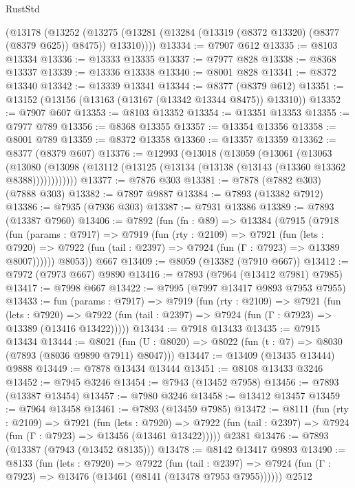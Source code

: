 \begin{lexlean}{RustStd}
\begin{coremodule}
{\begin{coremodule}
{{{{{{{{{{{{{{{{{{{{{{{{{{{{{{{{{{{{{{{{{{{{{{{{{{    (@13178
      (@13252 (@13275 (@13281 (@13284 (@13319 (@8372 @13320) (@8377 (@8379 @625)) @8475)) @13310))))
@13334 := @7907 @612
@13335 := @8103 @13334
@13336 := @13333 @13335
@13337 := @7977 @828
@13338 := @8368 @13337
@13339 := @13336 @13338
@13340 := @8001 @828
@13341 := @8372 @13340
@13342 := @13339 @13341
@13344 := @8377 (@8379 @612)
@13351 := @13152 (@13156 (@13163 (@13167 (@13342 @13344 @8475)) @13310))
@13352 := @7907 @607
@13353 := @8103 @13352
@13354 := @13351 @13353
@13355 := @7977 @789
@13356 := @8368 @13355
@13357 := @13354 @13356
@13358 := @8001 @789
@13359 := @8372 @13358
@13360 := @13357 @13359
@13362 := @8377 (@8379 @607)
@13376 := @12993
    (@13018
      (@13059
        (@13061
          (@13063
            (@13080 (@13098 (@13112 (@13125 (@13134 (@13138 (@13143 (@13360 @13362 @8388))))))))))))
@13377 := @7876 @303
@13381 := @7878 (@7882 @303) (@7888 @303)
@13382 := @7897 @9887
@13384 := @7893 (@13382 @7912)
@13386 := @7935 (@7936 @303)
@13387 := @7931 @13386
@13389 := @7893 (@13387 @7960)
@13406 := @7892
    (fun (fn : @89) =>
    @13384
      (@7915
        (@7918
          (fun (params : @7917) =>
          @7919
            (fun (rty : @2109) =>
            @7921
              (fun (lets : @7920) =>
              @7922 (fun (tail : @2397) => @7924 (fun (Γ : @7923) => @13389 @8007))))))
        @8053))
    @667
@13409 := @8059 (@13382 (@7910 @667))
@13412 := @7972 (@7973 @667) @9890
@13416 := @7893 (@7964 (@13412 @7981) @7985)
@13417 := @7998 @667
@13422 := @7995 (@7997 @13417 @9893 @7953 @7955)
@13433 := fun (params : @7917) =>
  @7919
    (fun (rty : @2109) =>
    @7921
      (fun (lets : @7920) =>
      @7922 (fun (tail : @2397) => @7924 (fun (Γ : @7923) => @13389 (@13416 @13422)))))
@13434 := @7918 @13433
@13435 := @7915 @13434
@13444 := @8021 (fun (U : @8020) => @8022 (fun (t : @7) => @8030 (@7893 (@8036 @9890 @7911) @8047)))
@13447 := @13409 (@13435 @13444) @9888
@13449 := @7878 @13434 @13444
@13451 := @8108 @13433 @3246
@13452 := @7945 @3246
@13454 := @7943 (@13452 @7958)
@13456 := @7893 (@13387 @13454)
@13457 := @7980 @3246
@13458 := @13412 @13457
@13459 := @7964 @13458
@13461 := @7893 (@13459 @7985)
@13472 := @8111
    (fun (rty : @2109) =>
    @7921
      (fun (lets : @7920) =>
      @7922 (fun (tail : @2397) => @7924 (fun (Γ : @7923) => @13456 (@13461 @13422)))))
    @2381
@13476 := @7893 (@13387 (@7943 (@13452 @8135)))
@13478 := @8142 @13417 @9893
@13490 := @8133
    (fun (lets : @7920) =>
    @7922
      (fun (tail : @2397) =>
      @7924 (fun (Γ : @7923) => @13476 (@13461 (@8141 (@13478 @7953 @7955))))))
    @2512
}}}}}}}}}}}}}}}}}}}}}}}}}}}}}}}}}}}}}}}}}}}}}}}}}}
\end{coremodule}}
\end{coremodule}
\end{lexlean}
